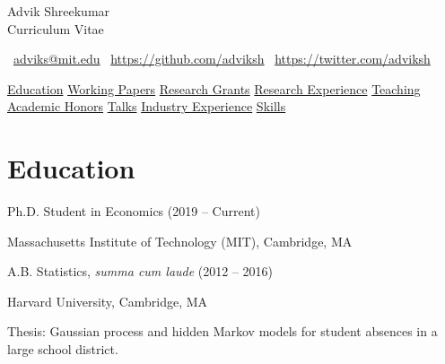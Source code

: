 \documentclass[12pt]{article}
\begin{document}
\begin{center}
{
  { \huge Advik Shreekumar } \\
  \vspace{0.3cm}
  { \large Curriculum Vitae }
}
\end{center}

\begin{center}
\faEnvelopeO \, \href{mailto:adviks@mit.edu}{adviks@mit.edu} \quad
\faGithub    \, \href{https://github.com/adviksh}{https://github.com/adviksh} \quad
\faTwitter   \, \href{https://twitter.com/AdvikSh}{https://twitter.com/adviksh}
\end{center}

\begin{center}
{
  \hyperref[sec:education]{Education} \quad
  \hyperref[sec:working_papers]{Working Papers} \quad
  \hyperref[sec:research_grants]{Research Grants} \quad
  \hyperref[sec:research_experience]{Research Experience} \quad
  \hyperref[sec:teaching]{Teaching} \\
  \vspace{0.1cm}
  \hyperref[sec:academic_honors]{Academic Honors} \quad
  \hyperref[sec:talks]{Talks} \quad
  \hyperref[sec:industry_experience]{Industry Experience} \quad
  \hyperref[sec:skills]{Skills} \quad
}
\end{center}

\section*{Education}
\label{sec:education}

Ph.D. Student in Economics (2019 – Current)
\begin{addmargin}[1em]{2em}
Massachusetts Institute of Technology (MIT), Cambridge, MA
\end{addmargin}

A.B. Statistics, \emph{summa cum laude} (2012 – 2016)
\begin{addmargin}[1em]{2em}
Harvard University, Cambridge, MA

Thesis: Gaussian process and hidden Markov models for student absences in a large school district.
\end{addmargin}
\end{document}
